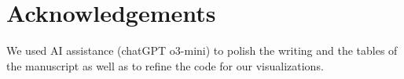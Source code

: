 \section*{Acknowledgements}
\label{sec:ack}
%

We used AI assistance (chatGPT o3-mini) to polish the writing and the tables of the manuscript as well as to refine the code for our visualizations.